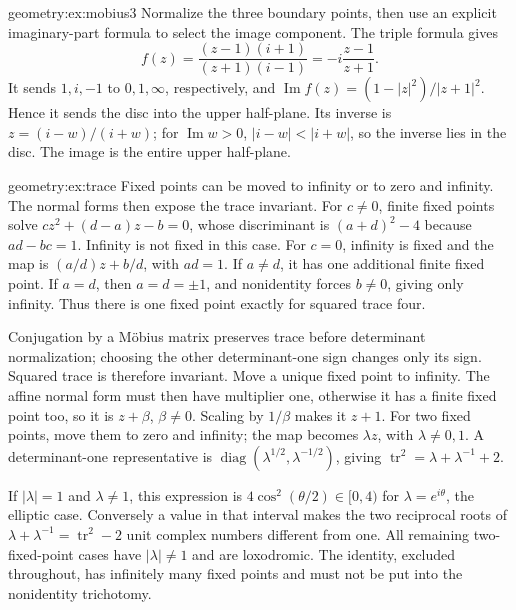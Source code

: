 \begin{solution}{geometry:ex:mobius3}
\idea Normalize the three boundary points, then use an explicit imaginary-part formula to select the image component.
\writeup The triple formula gives
\[
f(z)=\frac{(z-1)(i+1)}{(z+1)(i-1)}
=-i\frac{z-1}{z+1}.
\]
It sends $1,i,-1$ to $0,1,\infty$, respectively, and
$\operatorname{Im}f(z)=(1-|z|^2)/|z+1|^2$. Hence it sends the disc into the upper half-plane. Its inverse is $z=(i-w)/(i+w)$; for $\operatorname{Im}w>0$, $|i-w|<|i+w|$, so the inverse lies in the disc. The image is the entire upper half-plane.
\end{solution}

\begin{solution}{geometry:ex:trace}
\idea Fixed points can be moved to infinity or to zero and infinity. The normal forms then expose the trace invariant.
\writeup For $c\ne0$, finite fixed points solve $cz^2+(d-a)z-b=0$, whose discriminant is $(a+d)^2-4$ because $ad-bc=1$. Infinity is not fixed in this case. For $c=0$, infinity is fixed and the map is $(a/d)z+b/d$, with $ad=1$. If $a\ne d$, it has one additional finite fixed point. If $a=d$, then $a=d=\pm1$, and nonidentity forces $b\ne0$, giving only infinity. Thus there is one fixed point exactly for squared trace four.

Conjugation by a M\"obius matrix preserves trace before determinant normalization; choosing the other determinant-one sign changes only its sign. Squared trace is therefore invariant. Move a unique fixed point to infinity. The affine normal form must then have multiplier one, otherwise it has a finite fixed point too, so it is $z+\beta$, $\beta\ne0$. Scaling by $1/\beta$ makes it $z+1$. For two fixed points, move them to zero and infinity; the map becomes $\lambda z$, with $\lambda\ne0,1$. A determinant-one representative is $\operatorname{diag}(\lambda^{1/2},\lambda^{-1/2})$, giving $\operatorname{tr}^2=\lambda+\lambda^{-1}+2$.

If $|\lambda|=1$ and $\lambda\ne1$, this expression is $4\cos^2(\theta/2)\in[0,4)$ for $\lambda=e^{i\theta}$, the elliptic case. Conversely a value in that interval makes the two reciprocal roots of $\lambda+\lambda^{-1}=\operatorname{tr}^2-2$ unit complex numbers different from one. All remaining two-fixed-point cases have $|\lambda|\ne1$ and are loxodromic. The identity, excluded throughout, has infinitely many fixed points and must not be put into the nonidentity trichotomy.
\end{solution}

